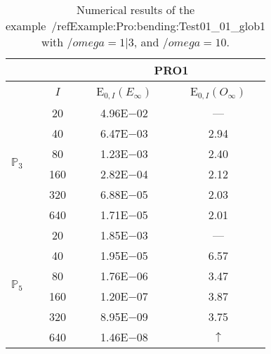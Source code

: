 \begin{table}[H]
\caption{Numerical results of the example~/ref{Example:Pro:bending:Test01_01_glob1} with $/omega=1|3$, and $/omega=10$.}
\setlength{\tabcolsep}{5pt}
\centering
\begin{tabular}{@{}l c c c@{}}
\toprule
 &  & \multicolumn{2}{c}{PRO1}\\
\midrule
 & $I$ & E$_{0,I}(E_{\infty})$ & E$_{0,I}(O_{\infty})$\\
\midrule
\multirow{6}{*}{$\mathbb{P}_{3}$}
 & 20 & 4.96E$-$02 & ---\\
 & 40 & 6.47E$-$03 & 2.94\\
 & 80 & 1.23E$-$03 & 2.40\\
 & 160 & 2.82E$-$04 & 2.12\\
 & 320 & 6.88E$-$05 & 2.03\\
 & 640 & 1.71E$-$05 & 2.01\\
\midrule
\multirow{6}{*}{$\mathbb{P}_{5}$}
 & 20 & 1.85E$-$03 & ---\\
 & 40 & 1.95E$-$05 & 6.57\\
 & 80 & 1.76E$-$06 & 3.47\\
 & 160 & 1.20E$-$07 & 3.87\\
 & 320 & 8.95E$-$09 & 3.75\\
 & 640 & 1.46E$-$08 & $\uparrow$\\
\bottomrule
\end{tabular}
\label{Table:PRO:test_01_01_test34_pro1}
\end{table}
